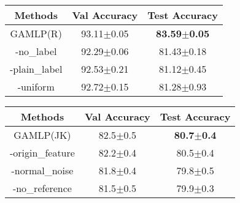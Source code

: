 \documentclass[sigconf]{acmart}
\begin{document}
\begin{table}
     \centering
    \label{tab:ablation_label}
     \begin{tabular}{c|cc}
\toprule
\textbf{Methods} & \textbf{Val Accuracy} & \textbf{Test Accuracy} \\
\midrule
GAMLP(R) & 93.11$\pm$0.05 & \textbf{83.59$\pm$0.05}  \\
-no\_label & 92.29$\pm$0.06 & 81.43$\pm$0.18  \\
-plain\_label & 92.53$\pm$0.21 & 81.12$\pm$0.45  \\
-uniform &92.72$\pm$0.15 & 81.28$\pm$0.93  \\
\bottomrule
\end{tabular}
\end{table}

\begin{table}
     \centering
    \label{tab:ablation_reference}
     \begin{tabular}{c|cc}
\toprule
\textbf{Methods} & \textbf{Val Accuracy} & \textbf{Test Accuracy} \\
\midrule
GAMLP(JK) & 82.5$\pm$0.5 &  \textbf{80.7$\pm$0.4}\\
-origin\_feature & 82.2$\pm$0.4 & 80.5$\pm$0.4  \\
-normal\_noise & 81.8$\pm$0.4 & 79.8$\pm$0.5 \\
-no\_reference & 81.5$\pm$0.5 & 79.9$\pm$0.3  \\
\bottomrule
\end{tabular}
\end{table}

\begin{table}[tpb!]
\caption{Test accuracy on ogbn-mag dataset.}
\centering
{
\noindent
\renewcommand{\multirowsetup}{\centering}
}
\label{table.mag_performance}
\vspace{-4mm}
\end{table}
\end{document}
